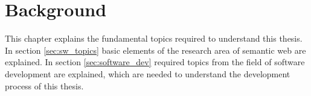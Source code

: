 \chapter{Background}
\label{ch:background}

This chapter explains the fundamental topics required to understand this thesis.
\\

In section \ref{sec:sw_topics} basic elements of the research area of semantic web are explained.
In section \ref{sec:software_dev} required topics from the field of software development are explained, which are needed to understand the development process of this thesis.






